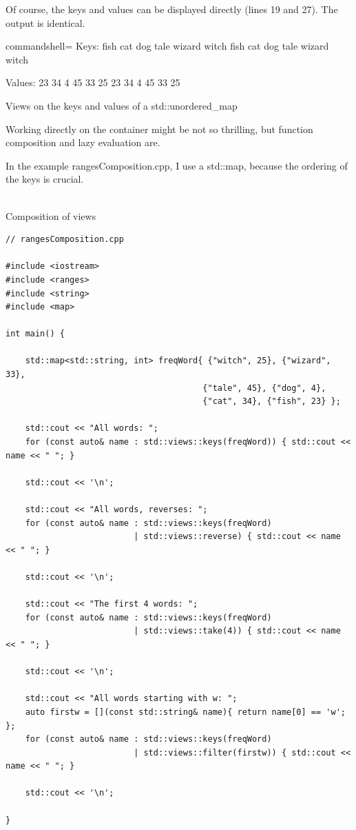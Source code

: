 Of course, the keys and values can be displayed directly (lines 19 and 27). The output is identical.

\begin{tcblisting}{commandshell={}}
Keys:
fish cat dog tale wizard witch
fish cat dog tale wizard witch

Values:
23 34 4 45 33 25
23 34 4 45 33 25
\end{tcblisting}

\begin{center}
Views on the keys and values of a std::unordered\_map
\end{center}

Working directly on the container might be not so thrilling, but function composition and lazy evaluation are.


In the example rangesComposition.cpp, I use a std::map, because the ordering of the keys is crucial.

\hspace*{\fill} \\ %
\noindent
Composition of views
\begin{lstlisting}[style=styleCXX]
// rangesComposition.cpp

#include <iostream>
#include <ranges>
#include <string>
#include <map>

int main() {
	
	std::map<std::string, int> freqWord{ {"witch", 25}, {"wizard", 33},
										{"tale", 45}, {"dog", 4},
										{"cat", 34}, {"fish", 23} };
	
	std::cout << "All words: ";
	for (const auto& name : std::views::keys(freqWord)) { std::cout << name << " "; }
	
	std::cout << '\n';
	
	std::cout << "All words, reverses: ";
	for (const auto& name : std::views::keys(freqWord)
	                      | std::views::reverse) { std::cout << name << " "; }
	
	std::cout << '\n';
	
	std::cout << "The first 4 words: ";
	for (const auto& name : std::views::keys(freqWord)
	                      | std::views::take(4)) { std::cout << name << " "; }
	
	std::cout << '\n';
	
	std::cout << "All words starting with w: ";
	auto firstw = [](const std::string& name){ return name[0] == 'w'; };
	for (const auto& name : std::views::keys(freqWord)
	                      | std::views::filter(firstw)) { std::cout << name << " "; }
	
	std::cout << '\n';

}
\end{lstlisting}

